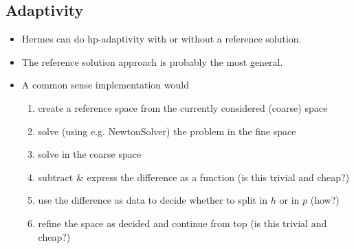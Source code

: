 \documentclass{beamer}
\begin{document}
\begin{frame}
\end{frame}


\subsection{Adaptivity}
\begin{frame}
\begin{itemize}
\item Hermes can do hp-adaptivity with or without a reference solution.
\item The reference solution approach is probably the most general.
\item A common sense implementation would
\begin{enumerate}
\item create a reference space from the currently considered (coarse) space
\item solve (using e.g. NewtonSolver) the problem in the fine space
\item solve in the coarse space
\item subtract \& express the difference as a function (is this trivial and cheap?)
\item use the difference as data to decide whether to split in $h$ or in $p$ (how?)
\item refine the space as decided and continue from top (is this trivial and cheap?)
\end{enumerate}
\end{itemize}
\end{frame}
\end{document}
